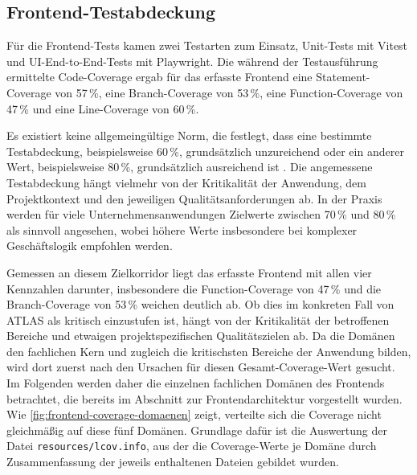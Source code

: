 \subsection{Frontend-Testabdeckung}

Für die Frontend-Tests kamen zwei Testarten zum Einsatz, Unit-Tests mit Vitest und UI-End-to-End-Tests mit Playwright. Die während der Testausführung ermittelte Code-Coverage ergab für das erfasste Frontend eine Statement-Coverage von 57\,\%, eine Branch-Coverage von 53\,\%, eine Function-Coverage von 47\,\% und eine Line-Coverage von 60\,\%.

Es existiert keine allgemeingültige Norm, die festlegt, dass eine bestimmte Testabdeckung, beispielsweise 60\,\%, grundsätzlich unzureichend oder ein anderer Wert, beispielsweise 80\,\%, grundsätzlich ausreichend ist \autocite{ZhuHallMay1997}. Die angemessene Testabdeckung hängt vielmehr von der Kritikalität der Anwendung, dem Projektkontext und den jeweiligen Qualitätsanforderungen ab. In der Praxis werden für viele Unternehmensanwendungen Zielwerte zwischen 70\,\% und 80\,\% als sinnvoll angesehen, wobei höhere Werte insbesondere bei komplexer Geschäftslogik empfohlen werden.

Gemessen an diesem Zielkorridor liegt das erfasste Frontend mit allen vier Kennzahlen darunter, insbesondere die Function-Coverage von 47\,\% und die Branch-Coverage von 53\,\% weichen deutlich ab. Ob dies im konkreten Fall von \ac{ATLAS} als kritisch einzustufen ist, hängt von der Kritikalität der betroffenen Bereiche und etwaigen projektspezifischen Qualitätszielen ab.
Da die Domänen den fachlichen Kern und zugleich die kritischsten Bereiche der Anwendung bilden, wird dort zuerst nach den Ursachen für diesen Gesamt-Coverage-Wert gesucht. Im Folgenden werden daher die einzelnen fachlichen Domänen des Frontends betrachtet, die bereits im Abschnitt zur Frontendarchitektur vorgestellt wurden. Wie \autoref{fig:frontend-coverage-domaenen} zeigt, verteilte sich die Coverage nicht gleichmäßig auf diese fünf Domänen. Grundlage dafür ist die Auswertung der Datei \texttt{resources/lcov.info}, aus der die Coverage-Werte je Domäne durch Zusammenfassung der jeweils enthaltenen Dateien gebildet wurden.

